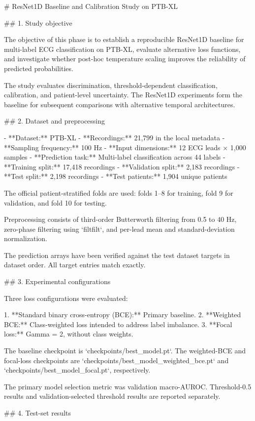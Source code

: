 # ResNet1D Baseline and Calibration Study on PTB-XL

## 1. Study objective

The objective of this phase is to establish a reproducible ResNet1D baseline for multi-label ECG classification on PTB-XL, evaluate alternative loss functions, and investigate whether post-hoc temperature scaling improves the reliability of predicted probabilities.

The study evaluates discrimination, threshold-dependent classification, calibration, and patient-level uncertainty. The ResNet1D experiments form the baseline for subsequent comparisons with alternative temporal architectures.

## 2. Dataset and preprocessing

- **Dataset:** PTB-XL
- **Recordings:** 21,799 in the local metadata
- **Sampling frequency:** 100 Hz
- **Input dimensions:** 12 ECG leads × 1,000 samples
- **Prediction task:** Multi-label classification across 44 labels
- **Training split:** 17,418 recordings
- **Validation split:** 2,183 recordings
- **Test split:** 2,198 recordings
- **Test patients:** 1,904 unique patients

The official patient-stratified folds are used: folds 1–8 for training, fold 9 for validation, and fold 10 for testing.

Preprocessing consists of third-order Butterworth filtering from 0.5 to 40 Hz, zero-phase filtering using `filtfilt`, and per-lead mean and standard-deviation normalization.

The prediction arrays have been verified against the test dataset targets in dataset order. All target entries match exactly.

## 3. Experimental configurations

Three loss configurations were evaluated:

1. **Standard binary cross-entropy (BCE):** Primary baseline.
2. **Weighted BCE:** Class-weighted loss intended to address label imbalance.
3. **Focal loss:** Gamma = 2, without class weights.

The baseline checkpoint is `checkpoints/best_model.pt`. The weighted-BCE and focal-loss checkpoints are `checkpoints/best_model_weighted_bce.pt` and `checkpoints/best_model_focal.pt`, respectively.

The primary model selection metric was validation macro-AUROC. Threshold-0.5 results and validation-selected threshold results are reported separately.

## 4. Test-set results

